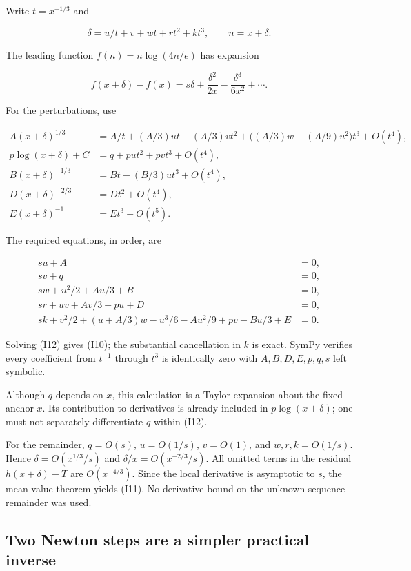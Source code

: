 \documentclass[11pt,letterpaper]{article}
\numberwithin{equation}{section}
\theoremstyle{remark}
\begin{document}
Write \(t=x^{-1/3}\) and

\[
\delta=u/t+v+wt+rt^2+kt^3,\qquad n=x+\delta.
\]

The leading function \(f(n)=n \log(4n/e)\) has expansion

\[
f(x+\delta)-f(x)=s\delta+\frac{\delta^2}{2x}
-\frac{\delta^3}{6x^2}+\cdots.
\]

For the perturbations, use

\[
\begin{aligned}
A(x+\delta)^{1/3}&=A/t+(A/3)ut+(A/3)vt^2
+\bigl((A/3)w-(A/9)u^2\bigr)t^3+O(t^4),\\
p\log(x+\delta)+C&=q+pu t^2+pv t^3+O(t^4),\\
B(x+\delta)^{-1/3}&=Bt-(B/3)u t^3+O(t^4),\\
D(x+\delta)^{-2/3}&=Dt^2+O(t^4),\\
E(x+\delta)^{-1}&=Et^3+O(t^5).
\end{aligned}
\]

The required equations, in order, are

\[
\begin{aligned}
su+A&=0,\\
sv+q&=0,\\
sw+u^2/2+Au/3+B&=0,\\
sr+uv+Av/3+pu+D&=0,\\
sk+v^2/2+(u+A/3)w-u^3/6-Au^2/9+pv-Bu/3+E&=0.
\end{aligned}
\tag{I12}
\]

Solving (I12) gives (I10); the substantial cancellation in \(k\) is exact. SymPy verifies every coefficient from \(t^{-1}\) through \(t^3\) is identically zero with \(A,B,D,E,p,q,s\) left symbolic.

Although \(q\) depends on \(x\), this calculation is a Taylor expansion about the fixed anchor \(x\). Its contribution to derivatives is already included in \(p \log(x+\delta)\); one must not separately differentiate \(q\) within (I12).

For the remainder, \(q=O(s)\), \(u=O(1/s)\), \(v=O(1)\), and \(w,r,k=O(1/s)\). Hence \(\delta=O(x^{1/3}/s)\) and \(\delta/x=O(x^{-2/3}/s)\). All omitted terms in the residual \(h(x+\delta)-T\) are \(O(x^{-4/3})\). Since the local derivative is asymptotic to \(s\), the mean-value theorem yields (I11). No derivative bound on the unknown sequence remainder was used.

\subsection{Two Newton steps are a simpler practical inverse}\label{air:rb:two-newton-steps-are-a-simpler-practical-inverse}
\end{document}
